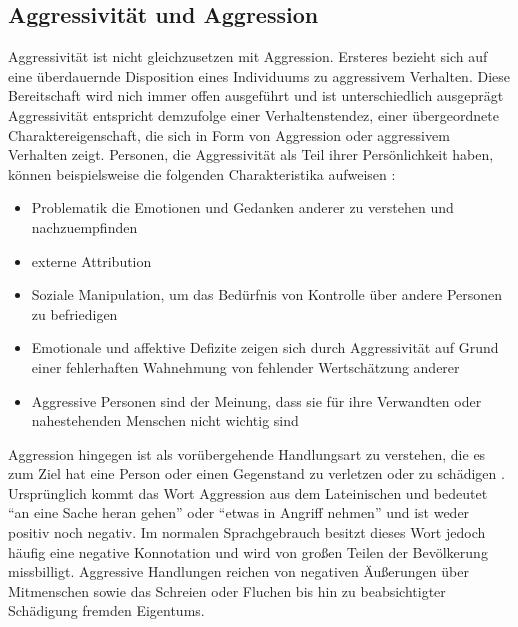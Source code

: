 \subsection{Aggressivität und Aggression}    \label{subsec_2.1.1}

Aggressivität ist nicht gleichzusetzen mit Aggression. Ersteres bezieht sich auf eine 
überdauernde Disposition eines Individuums zu aggressivem Verhalten. Diese Bereitschaft wird 
nich immer offen ausgeführt und ist unterschiedlich ausgeprägt
\parencite{Def_unterscheidung_Springer, Def_Aggressivität_Duden, Def_Aggressivität_Spektrum}
Aggressivität entspricht demzufolge einer Verhaltenstendez, einer übergeordnete 
Charaktereigenschaft, die sich in Form von Aggression oder aggressivem Verhalten zeigt.
Personen, die Aggressivität als Teil ihrer Persönlichkeit haben, können beispielsweise die  
folgenden Charakteristika aufweisen \parencite{Def_Aggressivität_eng1}:
\begin{itemize} [leftmargin=1.25cm]
      \item Problematik die Emotionen und Gedanken anderer zu verstehen und nachzuempfinden
      \item externe Attribution
      \item Soziale Manipulation, um das Bedürfnis von Kontrolle über andere 
            Personen zu befriedigen
      \item Emotionale und affektive Defizite zeigen sich durch Aggressivität auf Grund 
            einer fehlerhaften Wahnehmung von fehlender Wertschätzung anderer
      \item Aggressive Personen sind der Meinung, dass sie für ihre Verwandten oder nahestehenden
            Menschen nicht wichtig sind
\end{itemize}

Aggression hingegen ist als vorübergehende Handlungsart zu verstehen, die es zum Ziel hat eine 
Person oder einen Gegenstand zu verletzen oder zu schädigen
\parencite{Def_Aggression_1939, Def_unterscheidung_Springer, Def_Aggression_Duden}.
Ursprünglich kommt das Wort Aggression aus dem Lateinischen und bedeutet 
\enquote{an eine Sache heran gehen} oder \enquote{etwas in Angriff nehmen} \parencite{was_Aggression}
 und ist weder positiv noch negativ. Im normalen Sprachgebrauch besitzt dieses Wort jedoch 
häufig eine negative Konnotation und wird von großen Teilen der Bevölkerung missbilligt. 
Aggressive Handlungen reichen von negativen Äußerungen über Mitmenschen sowie das Schreien oder 
Fluchen bis hin zu beabsichtigter Schädigung fremden Eigentums. 

